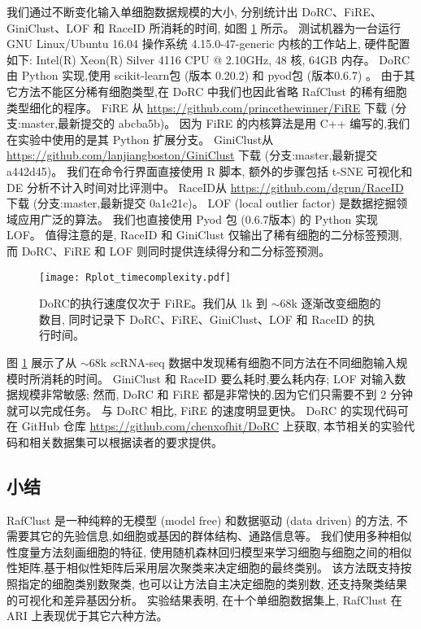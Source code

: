 我们通过不断变化输入单细胞数据规模的大小,
分别统计出 DoRC、FiRE、GiniClust、LOF  和 RaceID 所消耗的时间,
如图 \ref{fig:timecomplexity} 所示。
测试机器为一台运行 GNU Linux/Ubuntu 16.04 操作系统 4.15.0-47-generic 内核的工作站上,
硬件配置如下: Intel(R) Xeon(R) Silver 4116 CPU @ 2.10GHz, 48 核, 64GB 内存。
DoRC 由 Python 实现,使用 scikit-learn包 (版本 0.20.2) 和 pyod包 (版本0.6.7)  。
由于其它方法不能区分稀有细胞类型,在 DoRC 中我们也因此省略 RafClust 的稀有细胞类型细化的程序。
FiRE 从 \url{https://github.com/princethewinner/FiRE} 下载 (分支:master,最新提交的 abcba5b)。
因为 FiRE 的内核算法是用 C++ 编写的,我们在实验中使用的是其 Python 扩展分支。
GiniClust从 \url{https://github.com/lanjiangboston/GiniClust} 下载 (分支:master,最新提交 a442d45)。
我们在命令行界面直接使用 R 脚本,
额外的步骤包括 t-SNE 可视化和 DE 分析不计入时间对比评测中。
RaceID从 \url{https://github.com/dgrun/RaceID} 下载 (分支:master,最新提交 0a1e21c)。
LOF (local outlier factor) 是数据挖掘领域应用广泛的算法。
我们也直接使用 Pyod 包 (0.6.7版本)  的 Python 实现 LOF。
值得注意的是, RaceID 和 GiniClust 仅输出了稀有细胞的二分标签预测,
而 DoRC、FiRE 和 LOF 则同时提供连续得分和二分标签预测。
\begin{figure}[!htbp]
    \centering
    \texttt{[image: Rplot\_timecomplexity.pdf]}
    \caption{
    DoRC的执行速度仅次于 FiRE。我们从 1k 到 ${\sim} 68$k 逐渐改变细胞的数目, 同时记录下 DoRC、FiRE、GiniClust、LOF 和 RaceID 的执行时间。    
    }
    \label{fig:timecomplexity}
\end{figure}
图 \ref{fig:timecomplexity} 展示了从 ${\sim}68$k scRNA-seq 数据中发现稀有细胞不同方法在不同细胞输入规模时所消耗的时间。 
GiniClust 和 RaceID 要么耗时,要么耗内存;
LOF 对输入数据规模非常敏感;
然而, DoRC 和 FiRE 都是非常快的,因为它们只需要不到 2 分钟就可以完成任务。
与 DoRC 相比, FiRE 的速度明显更快。
DoRC 的实现代码可在 GitHub 仓库 \url{https://github.com/chenxofhit/DoRC} 上获取,
本节相关的实验代码和相关数据集可以根据读者的要求提供。

\subsection{小结}

RafClust 是一种纯粹的无模型 (model free) 和数据驱动 (data driven) 的方法,
不需要其它的先验信息,如细胞或基因的群体结构、通路信息等。
我们使用多种相似性度量方法刻画细胞的特征,
使用随机森林回归模型来学习细胞与细胞之间的相似性矩阵,基于相似性矩阵后采用层次聚类来决定细胞的最终类别。
该方法既支持按照指定的细胞类别数聚类, 也可以让方法自主决定细胞的类别数,
还支持聚类结果的可视化和差异基因分析。
实验结果表明, 在十个单细胞数据集上, RafClust 在 ARI 上表现优于其它六种方法。

